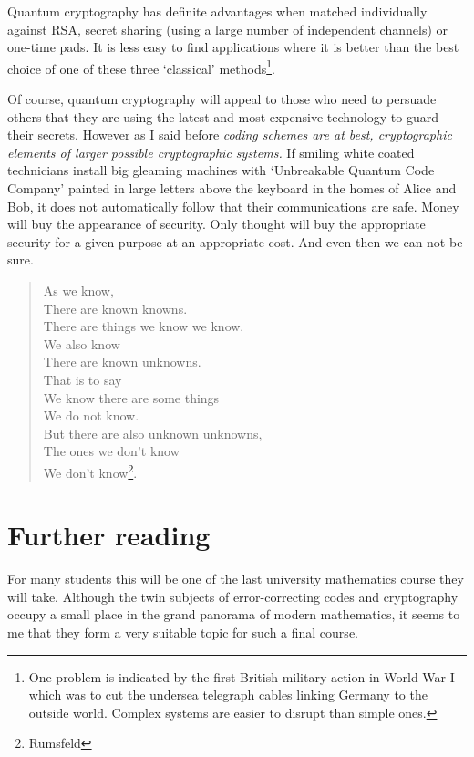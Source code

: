 \documentclass[12pt,a4paper]{article}
\theoremstyle{plain}
\theoremstyle{definition}
\begin{document}
    Quantum cryptography has definite advantages when
    matched individually against RSA, secret sharing (using a large
    number of independent channels) or one-time pads.
    It is less easy to find applications where
    it is better than the best choice of one of
    these three `classical' methods\footnote{One problem
    is indicated by the first British military action
    in World War I which was to cut the undersea
    telegraph cables linking Germany to the outside world.
    Complex systems are easier to disrupt than simple ones.}.

    Of course, quantum cryptography will appeal to
    those who need to persuade others that they are using
    the latest and most expensive technology to
    guard their secrets. However as I said before
    \emph{coding schemes
    are at best, cryptographic elements
    of larger possible cryptographic systems.}
    If smiling white coated technicians install big
    gleaming machines with `Unbreakable
    Quantum Code Company' painted in large letters
    above the keyboard in the homes of Alice and Bob,
    it does not automatically follow that their
    communications are safe. Money will buy
    the appearance of security. Only thought will buy
    the appropriate security for a given purpose
    at an appropriate cost. And even then we can not
    be sure.

    \begin{verse}
        As we know,\\
        There are known knowns.\\
        There are things we know we know.\\
        We also know\\
        There are known unknowns.\\
        That is to say\\
        We know there are some things\\
        We do not know.\\
        But there are also unknown unknowns,\\
        The ones we don't know\\
        We don't know\footnote{Rumsfeld}.
    \end{verse}

    \section{Further reading} For many students
    this will be one of the last university mathematics
    course they will take. Although the twin
    subjects of error-correcting codes and
    cryptography occupy a small place in the
    grand panorama of modern mathematics,
    it seems to me that they form a very suitable
    topic for such a final course.
\end{document}
